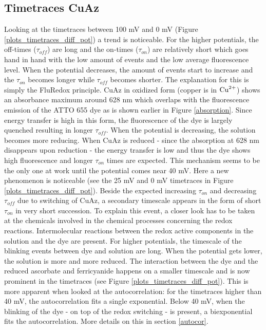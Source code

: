\documentclass[twoside,single]{lion-msc}
\begin{document}
\subsection{Timetraces CuAz}

Looking at the timetraces between 100 mV and 0 mV (Figure \ref{plots_timetraces_diff_pot}) a trend is noticeable. For the higher potentials, the off-times ($\tau_{off}$) are long and the on-times ($\tau_{on}$) are relatively short which goes hand in hand with the low amount of events and the low average fluorescence level. When the potential decreases, the amount of events start to increase and the $\tau_{on}$ becomes longer while $\tau_{off}$ becomes shorter. The explanation for this is simply the FluRedox principle. CuAz in oxidized form (copper is in $\textup{Cu}^{2+}$) shows an absorbance maximum around 628 nm which overlaps with the fluorescence emission of the ATTO 655 dye as is shown earlier in Figure \ref{absorption}. Since energy transfer is high in this form, the fluorescence of the dye is largely quenched resulting in longer $\tau_{off}$. When the potential is decreasing, the solution becomes more reducing. When CuAz is reduced - since the absorption at 628 nm disappears upon reduction - the energy transfer is low and thus the dye shows high fluorescence and longer $\tau_{on}$ times are expected. This mechanism seems to be the only one at work until the potential comes near 40 mV. Here a new phenomenon is noticeable (see the 25 mV and 0 mV timetraces in Figure \ref{plots_timetraces_diff_pot}). Beside the expected  increasing $\tau_{on}$ and decreasing $\tau_{off}$ due to switching of CuAz, a secondary timescale appears in the form of short $\tau_{on}$ in very short succession. To explain this event, a closer look has to be taken at the chemicals involved in the chemical processes concerning the redox reactions. Intermolecular reactions between the redox active components in the solution and the dye are present. For higher potentials, the timescale of the blinking events between dye and solution are long. When the potential gets lower, the solution is more and more reduced. The interaction between the dye and the reduced ascorbate and ferricyanide happens on a smaller timescale and is now prominent in the timetraces (see Figure \ref{plots_timetraces_diff_pot}). This is more apparent when looked at the autocorrelation: for the timetraces higher than 40 mV, the autocorrelation fits a single exponential. Below 40 mV, when the blinking of the dye - on top of the redox switching - is present, a biexponential fits the autocorrelation. More details on this in section \ref{autocor}.
\end{document}
